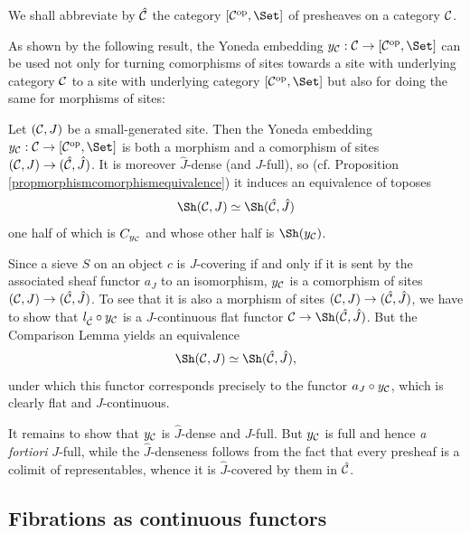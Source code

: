 \documentclass[a4paper,12pt]{article}
\begin{document}
We shall abbreviate by $\hat{\cal C}$ the category $[{\cal C}^{\textup{op}}, \Set]$ of presheaves on a category $\cal C$. 

As shown by the following result, the Yoneda embedding $y_{\cal C}:{\cal C}\to [{\cal C}^{\textup{op}}, \Set]$ can be used not only for turning comorphisms of sites towards a site with underlying category $\cal C$ to a site with underlying category $[{\cal C}^{\textup{op}}, \Set]$ but also for doing the same for morphisms of sites:

\begin{proposition}\label{propyonedamorcomor}
	Let $({\cal C}, J)$ be a small-generated site. Then the Yoneda embedding $y_{\cal C}:{\cal C}\to [{\cal C}^{\textup{op}}, \Set]$ is both a morphism and a comorphism of sites $({\cal C}, J)\to (\hat{\cal C}, \hat{J})$. It is moreover $\hat{J}$-dense (and $J$-full), so (cf. Proposition \ref{propmorphismcomorphismequivalence}) it induces an equivalence of toposes 	
	\[
	\Sh({\cal C}, J) \simeq \Sh(\hat{\cal C}, \hat{J})
	\]
	one half of which is $C_{y_{\cal C}}$ and whose other half is $\Sh(y_{\cal C})$.
\end{proposition}

\begin{proofs}
	Since a sieve $S$ on an object $c$ is $J$-covering if and only if it is sent by the associated sheaf functor $a_{J}$ to an isomorphism, $y_{\cal C}$ is a comorphism of sites $({\cal C}, J) \to (\hat{\cal C}, \hat{J})$. To see that it is also a morphism of sites  $({\cal C}, J) \to (\hat{\cal C}, \hat{J})$, we have to show that $l_{\hat{\cal C}}\circ y_{\cal C}$ is a $J$-continuous flat functor ${\cal C} \to \Sh(\hat{\cal C}, \hat{J})$. But the Comparison Lemma yields an equivalence
	\[
	\Sh({\cal C}, J) \simeq \Sh(\hat{\cal C}, \hat{J}),
	\]    
	under which this functor corresponds precisely to the functor $a_{J}\circ y_{\cal C}$, which is clearly flat and $J$-continuous. 
	
	It remains to show that $y_{\cal C}$ is $\hat{J}$-dense and $J$-full. But $y_{\cal C}$ is full and hence \emph{a fortiori} $J$-full, while the $\hat{J}$-denseness follows from the fact that every presheaf is a colimit of representables, whence it is $\hat{J}$-covered by them in $\hat{\cal C}$. 
\end{proofs}



\subsection{Fibrations as continuous functors}
\end{document}
